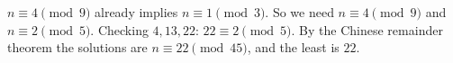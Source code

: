 $n\equiv4\pmod9$ already implies $n\equiv1\pmod3$. So we need $n\equiv4\pmod 9$ and $n\equiv2\pmod5$. Checking $4,13,22$: $22\equiv2\pmod5$. By the Chinese remainder theorem the solutions are $n\equiv22\pmod{45}$, and the least is $\boxed{22}$.
